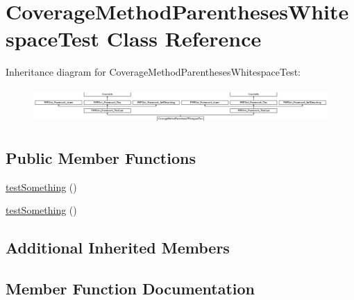 \hypertarget{class_coverage_method_parentheses_whitespace_test}{}\section{Coverage\+Method\+Parentheses\+Whitespace\+Test Class Reference}
\label{class_coverage_method_parentheses_whitespace_test}
Inheritance diagram for Coverage\+Method\+Parentheses\+Whitespace\+Test\+:\begin{figure}[H]
\begin{center}
\leavevmode
\includegraphics[height=1.352657cm]{class_coverage_method_parentheses_whitespace_test}
\end{center}
\end{figure}
\subsection*{Public Member Functions}
\begin{DoxyCompactItemize}
\item 
\mbox{\hyperlink{class_coverage_method_parentheses_whitespace_test_a0fc4e17369bc9607ebdd850d9eda8167}{test\+Something}} ()
\item 
\mbox{\hyperlink{class_coverage_method_parentheses_whitespace_test_a0fc4e17369bc9607ebdd850d9eda8167}{test\+Something}} ()
\end{DoxyCompactItemize}
\subsection*{Additional Inherited Members}


\subsection{Member Function Documentation}
\mbox{\label{class_coverage_method_parentheses_whitespace_test_a0fc4e17369bc9607ebdd850d9eda8167}} 
